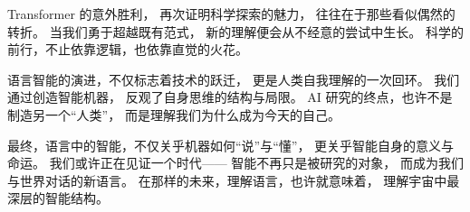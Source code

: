 Transformer 的意外胜利，  
再次证明科学探索的魅力，  
往往在于那些看似偶然的转折。  
当我们勇于超越既有范式，  
新的理解便会从不经意的尝试中生长。  
科学的前行，不止依靠逻辑，也依靠直觉的火花。  

语言智能的演进，不仅标志着技术的跃迁，  
更是人类自我理解的一次回环。  
我们通过创造智能机器，  
反观了自身思维的结构与局限。  
AI 研究的终点，也许不是制造另一个“人类”，  
而是理解我们为什么成为今天的自己。  

最终，语言中的智能，不仅关乎机器如何“说”与“懂”，  
更关乎智能自身的意义与命运。  
我们或许正在见证一个时代——  
智能不再只是被研究的对象，  
而成为我们与世界对话的新语言。  
在那样的未来，理解语言，也许就意味着，  
理解宇宙中最深层的智能结构。  

